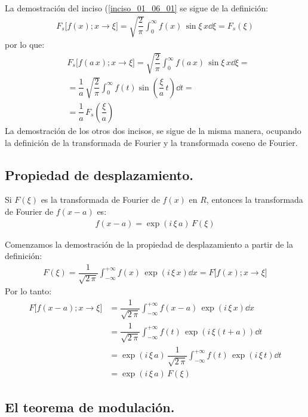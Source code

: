 La demostración del inciso (\ref{inciso_01_06_01} se sigue de la definición:
\begin{align*}
F_{s} \big[f(x); x \to \xi \big] = \sqrt{\dfrac{2}{\pi}} \int_{0}^{\infty} f(x) \, \sin \xi \, x \dd{\xi} = F_{s} (\xi)
\end{align*}
por lo que:
\begin{align*}
&F_{s} \big[f(a \, x); x \to \xi \big] = \sqrt{\dfrac{2}{\pi}} \int_{0}^{\infty} f(a \, x) \, \sin \xi \, x \dd{\xi} = \\[0.5em]
&= \dfrac{1}{a} \, \sqrt{\dfrac{2}{\pi}} \int_{0}^{\infty} f(t) \sin \left( \dfrac{\xi}{a} \, t \right) \dd{t} = \\[0.5em]
&= \dfrac{1}{a} \, F_{s} \left( \dfrac{\xi}{a} \right)
\end{align*}
La demostración de los otros dos incisos, se sigue de la misma manera, ocupando la definición de la transformada de Fourier y la transformada coseno de Fourier.

\subsection{Propiedad de desplazamiento.}

Si $F(\xi)$ es la transformada de Fourier de $f(x)$ en $R$, entonces la transformada de Fourier de $f(x - a)$ es:
\begin{align*}
f(x - a) = \exp(i \, \xi \, a) \, F(\xi)
\end{align*}

Comenzamos la demostración de la propiedad de desplazamiento a partir de la definición:
\begin{align*}
F(\xi) = \dfrac{1}{\sqrt{2 \, \pi}} \int_{-\infty}^{+\infty} f(x) \, \exp(i \, \xi \, x) \dd{x} = F \big[f(x); x \to \xi \big]
\end{align*}
Por lo tanto:
\begin{align*}
F \big[f(x - a); x \to \xi \big] &= \dfrac{1}{\sqrt{2 \, \pi}} \int_{-\infty}^{+\infty} f(x - a) \, \exp(i \, \xi \, x) \dd{x} \\[0.5em]
&= \dfrac{1}{\sqrt{2 \, \pi}} \int_{-\infty}^{+\infty} f(t) \, \exp(i \, \xi (t + a)) \dd{t} \\[0.5em]
&= \exp(i \, \xi \, a) \, \dfrac{1}{\sqrt{2 \, \pi}} \int_{-\infty}^{+\infty} f(t) \, \exp(i \, \xi \, t) \dd{t} \\[0.5em]
&= \exp(i \, \xi \, a) \, F (\xi) 
\end{align*}

\subsection{El teorema de modulación.}

